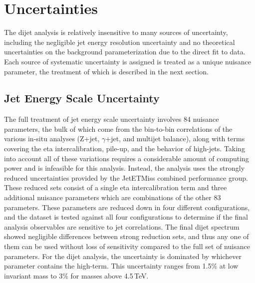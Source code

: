 \section{Uncertainties}

The dijet analysis is relatively insensitive to many sources of uncertainty, including the negligible jet energy resolution uncertainty and no theoretical uncertainties on the background parameterization due to the direct fit to data.  Each source of systematic uncertainty is assigned is treated as a unique nuisance parameter, the treatment of which is described in the next section.

\subsection{Jet Energy Scale Uncertainty}
The full treatment of jet energy scale uncertainty involves 84 nuisance parameters, the bulk of which come from the bin-to-bin correlations of the various in-situ analyses (Z+jet, $\gamma$+jet, and multijet balance), along with terms covering the eta intercalibration, pile-up, and the behavior of high-\pt jets.  Taking into account all of these variations requires a considerable amount of computing power and is infeasible for this analysis.  Instead, the analysis uses the strongly reduced uncertainties provided by the JetETMiss combined performance group.  These reduced sets consist of a single eta intercalibration term and three additional nuisance parameters which are combinations of the other 83 parameters.  These parameters are reduced down in four different configurations, and the dataset is tested against all four configurations to determine if the final analysis observables are sensitive to jet correlations.  The final dijet spectrum showed negligible differences between strong reduction sets, and thus any one of them can be used without loss of sensitivity compared to the full set of nuisance parameters.
For the dijet analysis, the uncertainty is dominated by whichever parameter contains the high-\pt term.  This uncertainty ranges from 1.5\% at low invariant mass to 3\% for masses above 4.5\,TeV.\
